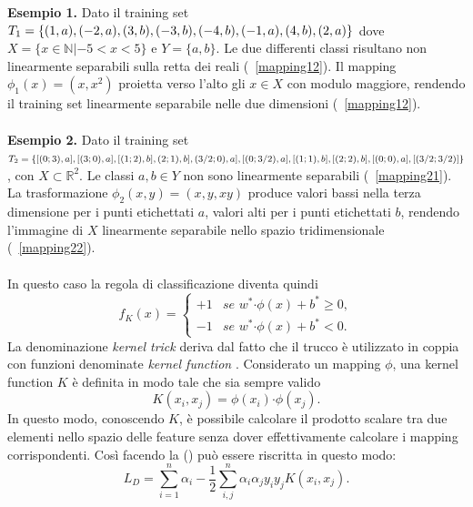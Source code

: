 \documentclass [11pt,a4paper,twoside,openright] {book}
\begin{document}
\textbf{Esempio 1.} Dato il training set $T_1=\lbrace (1,a),(-2,a),(3,b),(-3,b),(-4,b), \linebreak (-1,a),(4,b),(2,a) \rbrace$ dove $X = \lbrace x \in \mathbb{N} | -5 < x < 5 \rbrace$ e $Y=\lbrace a,b \rbrace$. Le due differenti classi risultano non linearmente separabili sulla retta dei reali (\figurename~\ref{mapping12}). Il mapping $\phi_1(x)=(x,x^2)$ proietta verso l'alto gli $x \in X$ con modulo maggiore, rendendo il training set linearmente separabile nelle due dimensioni (\figurename~\ref{mapping12}).\\\\
\textbf{Esempio 2.} Dato il training set $T_2=\lbrace [(0;3),a], [(3;0),a], [(1;2),b], (2;1),b], \linebreak (3/2;0),a], [(0;3/2),a], [(1;1),b], [(2;2),b], [(0;0),a], [(3/2; 3/2)] \rbrace$, con $X \subset \mathbb{R}^2$. Le classi $a, b \in Y$ non sono linearmente separabili (\figurename~\ref{mapping21}). La trasformazione $\phi_2(x,y)=(x,y,xy)$ produce valori bassi nella terza dimensione per i punti etichettati $a$, valori alti per i punti etichettati $b$, rendendo l'immagine di $X$ linearmente separabile nello spazio tridimensionale (\figurename~\ref{mapping22}).\\\\
In questo caso la regola di classificazione diventa quindi
\begin{equation}
f_K(x)=
\begin{cases}
+1 & \textit{se } w^* \boldsymbol{\cdot} \phi(x) + b^* \geq 0, \\
-1 & \textit{se } w^* \boldsymbol{\cdot} \phi(x)  + b^*< 0.
\end{cases}
\end{equation}
La denominazione \textit{kernel trick} deriva dal fatto che il trucco è utilizzato in coppia con funzioni denominate \textit{kernel function} \cite{shawe2004kernel}. Considerato un mapping $\phi$, una kernel function $K$ è definita in modo tale che sia sempre valido
\begin{equation}
K(x_i,x_j) = \phi(x_i) \boldsymbol{\cdot} \phi(x_j).
\end{equation}
In questo modo, conoscendo $K$, è possibile calcolare il prodotto scalare tra due elementi nello spazio delle feature senza dover effettivamente calcolare i mapping corrispondenti. Così facendo la () può essere riscritta in questo modo:
\begin{equation}
L_D = \sum_{i=1}^n \alpha_i -\dfrac{1}{2} \sum_{i,j}^n \alpha_i \alpha_j y_i y_j K(x_i,x_j).
\end{equation}
\end{document}
